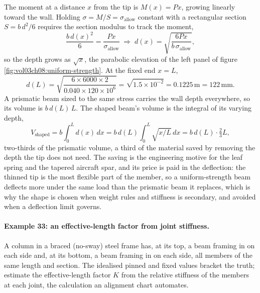 The moment at a distance $x$ from the tip is $M(x) = Px$, growing linearly
toward the wall. Holding $\sigma = M/S = \sigma_{\text{allow}}$ constant
with a rectangular section $S = b\,d^2/6$ requires the section modulus to
track the moment,
\[
\frac{b\,d(x)^2}{6} = \frac{P x}{\sigma_{\text{allow}}}
\;\Rightarrow\;
d(x) = \sqrt{\frac{6 P x}{b\,\sigma_{\text{allow}}}},
\]
so the depth grows as $\sqrt{x}$, the parabolic elevation of the left
panel of figure \ref{fig:vol03ch08:uniform-strength}. At the fixed end
$x = L$,
\[
d(L) = \sqrt{\frac{6 \times 6000 \times 2}{0.040 \times 120 \times 10^6}}
= \sqrt{1.5 \times 10^{-2}} = 0.1225\,\si{\meter} = 122\,\si{\milli\meter}.
\]
A prismatic beam sized to the same stress carries the wall depth
everywhere, so its volume is $b\,d(L)\,L$. The shaped beam's volume is the
integral of its varying depth,
\[
V_{\text{shaped}} = b\int_0^L d(x)\,dx
= b\,d(L)\int_0^L \sqrt{x/L}\,dx = b\,d(L)\cdot\tfrac23 L,
\]
two-thirds of the prismatic volume, a third of the material saved by
removing the depth the tip does not need. The saving is the engineering
motive for the leaf spring and the tapered aircraft spar, and its price is
paid in the deflection: the thinned tip is the most flexible part of the
member, so a uniform-strength beam deflects more under the same load than
the prismatic beam it replaces, which is why the shape is chosen when
weight rules and stiffness is secondary, and avoided when a deflection
limit governs.

\paragraph{Example 33: an effective-length factor from joint stiffness.} A
column in a braced (no-sway) steel frame has, at its top, a beam framing in
on each side and, at its bottom, a beam framing in on each side, all
members of the same length and section. The idealised pinned and fixed
values bracket the truth; estimate the effective-length factor $K$ from the
relative stiffness of the members at each joint, the calculation an
alignment chart automates.

